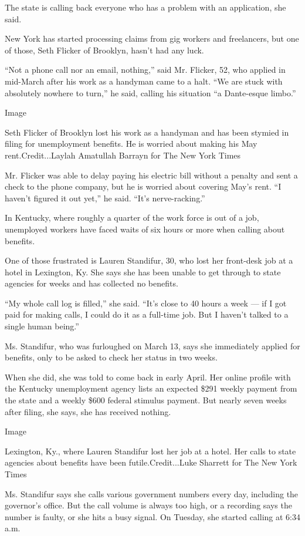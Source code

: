 The state is calling back everyone who has a problem with an
application, she said.

New York has started processing claims from gig workers and freelancers,
but one of those, Seth Flicker of Brooklyn, hasn't had any luck.

``Not a phone call nor an email, nothing,'' said Mr. Flicker, 52, who
applied in mid-March after his work as a handyman came to a halt. ``We
are stuck with absolutely nowhere to turn,'' he said, calling his
situation ``a Dante-esque limbo.''

Image

Seth Flicker of Brooklyn lost his work as a handyman and has been
stymied in filing for unemployment benefits. He is worried about making
his May rent.Credit...Laylah Amatullah Barrayn for The New York Times

Mr. Flicker was able to delay paying his electric bill without a penalty
and sent a check to the phone company, but he is worried about covering
May's rent. ``I haven't figured it out yet,'' he said. ``It's
nerve-racking.''

In Kentucky, where roughly a quarter of the work force is out of a job,
unemployed workers have faced waits of six hours or more when calling
about benefits.

One of those frustrated is Lauren Standifur, 30, who lost her front-desk
job at a hotel in Lexington, Ky. She says she has been unable to get
through to state agencies for weeks and has collected no benefits.

``My whole call log is filled,'' she said. ``It's close to 40 hours a
week --- if I got paid for making calls, I could do it as a full-time
job. But I haven't talked to a single human being.''

Ms. Standifur, who was furloughed on March 13, says she immediately
applied for benefits, only to be asked to check her status in two weeks.

When she did, she was told to come back in early April. Her online
profile with the Kentucky unemployment agency lists an expected \$291
weekly payment from the state and a weekly \$600 federal stimulus
payment. But nearly seven weeks after filing, she says, she has received
nothing.

Image

Lexington, Ky., where Lauren Standifur lost her job at a hotel. Her
calls to state agencies about benefits have been futile.Credit...Luke
Sharrett for The New York Times

Ms. Standifur says she calls various government numbers every day,
including the governor's office. But the call volume is always too high,
or a recording says the number is faulty, or she hits a busy signal. On
Tuesday, she started calling at 6:34 a.m.

